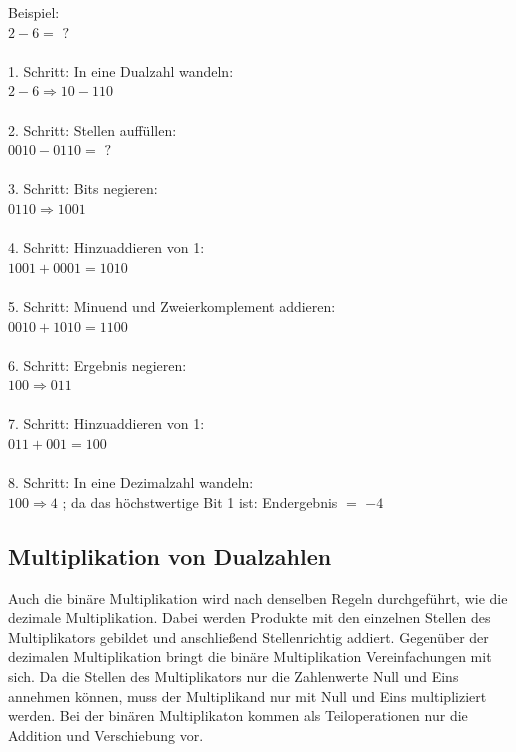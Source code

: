 \documentclass[a4paper,12pt,fleqn,oneside]{article}
\begin{document}
\newpage

		Beispiel:\\
		$ 2 - 6 =$ $ ? $ \\
		\\
		1. Schritt: In eine Dualzahl wandeln:\\
		$ 2 - 6 \Rightarrow 10 - 110$\\
		\\
		2. Schritt: Stellen auffüllen:\\
		$ 0010 - 0110 =$ $ ? $\\
		\\
		3. Schritt: Bits negieren:\\
		$ 0110 \Rightarrow 1001$\\
		\\
		4. Schritt: Hinzuaddieren von 1:\\
		$ 1001 + 0001 = 1010$\\
		\\
		5. Schritt: Minuend und Zweierkomplement addieren:\\
		$ 0010 + 1010 = 1100$\\
		\\
		6. Schritt: Ergebnis negieren:\\
		$ 100 \Rightarrow 011$\\
		\\
		7. Schritt: Hinzuaddieren von 1:\\
		$ 011 + 001 = 100$\\
		\\
		8. Schritt: In eine Dezimalzahl wandeln:\\
		$ 100 \Rightarrow 4$ ; da das höchstwertige Bit 1 ist: Endergebnis $=$ $ -4$\\

\newpage

	\subsection{Multiplikation von Dualzahlen}
		Auch die binäre Multiplikation wird nach denselben Regeln durchgeführt, wie die dezimale Multiplikation. Dabei werden
		Produkte mit den einzelnen Stellen des Multiplikators gebildet und anschließend Stellenrichtig addiert. Gegenüber der
		dezimalen Multiplikation bringt die binäre Multiplikation Vereinfachungen mit sich. Da die Stellen des Multiplikators nur die
		Zahlenwerte Null und Eins annehmen können, muss der Multiplikand nur mit Null und Eins multipliziert werden. Bei der
		binären Multiplikaton kommen als Teiloperationen nur die Addition und Verschiebung vor.\\
\end{document}
